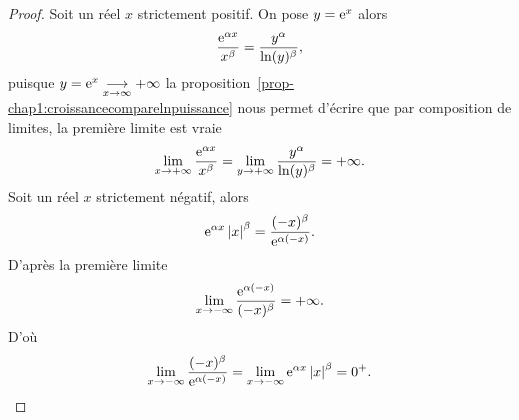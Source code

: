 %
\begin{proof}
  Soit un réel \(x\) strictement positif. On pose \(y=\operatorname{e}^{x}\) alors
  \begin{equation}
    \frac{\operatorname{e}^{\alpha x}}{x^\beta}=\frac{y^\alpha}{\ln(y)^\beta},
  \end{equation}
  puisque \(y = \operatorname{e}^{x} \underset{x \to \infty}{\longrightarrow}+\infty\) la proposition~\ref{prop-chap1:croissancecomparelnpuissance} nous permet d'écrire que par composition de limites, la première limite est vraie
  \begin{equation}
      \lim\limits_{x \to + \infty} \frac{\operatorname{e}^{\alpha x}}{x^\beta}= \lim\limits_{y \to +\infty} \frac{y^\alpha}{\ln(y)^\beta}=+\infty.
  \end{equation}
  Soit un réel \(x\) strictement négatif, alors
  \begin{equation}
    \operatorname{e}^{\alpha x}\left\lvert x\right\rvert^\beta=\frac{(-x)^\beta}{\operatorname{e}^{\alpha(-x)}}.
  \end{equation}
  D'après la première limite
  \begin{equation}
    \lim\limits_{x \to - \infty} \frac{\operatorname{e}^{\alpha (-x)}}{(-x)^\beta}=+\infty.
  \end{equation}
  D'où
  \begin{equation}
    \lim\limits_{x\to -\infty}\frac{(-x)^\beta}{\operatorname{e}^{\alpha (-x)}}=\lim\limits_{x \to -\infty} \operatorname{e}^{\alpha x} \left\lvert x\right\rvert^\beta=0^+.
  \end{equation}
\end{proof}
%
